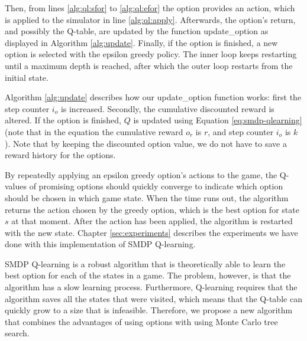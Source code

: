 Then, from lines \ref{alg:ql:sfor} to \ref{alg:ql:efor} the option provides an
action, which is applied to the simulator in line \ref{alg:ql:apply}.
Afterwards, the option's return, and possibly the Q-table, are updated by the
function \textsf{update\_option} as displayed in Algorithm \ref{alg:update}.
Finally, if the option is finished, a new option is selected with the
epsilon greedy policy. The inner loop keeps restarting until a maximum depth is
reached, after which the outer loop restarts from the initial state.

Algorithm \ref{alg:update} describes how our \textsf{update\_option}
function works: first the step counter $i_o$ is increased. Secondly, the
cumulative discounted reward is altered. If the option is finished, $Q$ is
updated using Equation \ref{eq:smdp-qlearning} (note that in the equation the
cumulative reward $o_r$ is $r$, and step counter $i_o$ is $k$). Note that by
keeping the discounted option value, we do not have to save a reward history
for the options.

By repeatedly applying an epsilon greedy option's actions to the game, the
Q-values of promising options should quickly converge to indicate which option
should be chosen in which game state. When the time runs out, the algorithm
returns the action chosen by the greedy option, which is the best option for
state $s$ at that moment. After the action has been applied, the algorithm is
restarted with the new state. Chapter \ref{sec:experiments} describes the
experiments we have done with this implementation of SMDP Q-learning.

SMDP Q-learning is a robust algorithm that is theoretically able to learn the
best option for each of the states in a game. The problem, however, is that the
algorithm has a slow learning process. Furthermore, Q-learning requires that the
algorithm saves all the states that were visited, which means that the Q-table
can quickly grow to a size that is infeasible. Therefore, we propose a new
algorithm that combines the advantages of using options with using Monte Carlo
tree search.
